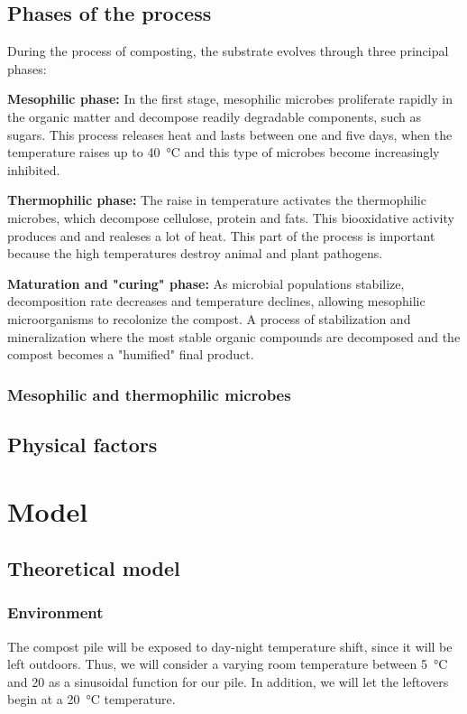 \documentclass[12pt, a4paper, twocolumn]{article}
\numberwithin{table}{section}
\numberwithin{figure}{section}
\numberwithin{equation}{section}
\begin{document}
\subsection{Phases of the process}
During the process of composting, the substrate evolves through three principal phases:

\textbf{Mesophilic phase:} In the first stage, mesophilic microbes proliferate rapidly in the organic matter and decompose readily degradable components, such as sugars. This process releases heat and lasts between one and five days, when the temperature raises up to \SI{40}{\celsius} and this type of microbes become increasingly inhibited.

\textbf{Thermophilic phase:} The raise in temperature activates the thermophilic microbes, which decompose cellulose, protein and fats. This biooxidative activity produces  and  and realeses a lot of heat. This part of the process is important because the high temperatures destroy animal and plant pathogens.

\textbf{Maturation and "curing" phase:} As microbial populations stabilize, decomposition rate decreases and temperature declines, allowing mesophilic microorganisms to recolonize the compost. A process of stabilization and mineralization where the most stable organic compounds are decomposed and the compost becomes a "humified" final product.
 
\subsubsection{Mesophilic and thermophilic microbes}
\subsection{Physical factors}


\section{Model}

\subsection{Theoretical model}

\subsubsection{Environment}

The compost pile will be exposed to day-night temperature shift, since it will be left outdoors. Thus, we will consider a varying room temperature between \SI{5}{\celsius} and \si{20}{\celsius} as a sinusoidal function for our pile. In addition, we will let the leftovers begin at a \SI{20}{\celsius} temperature.  
\end{document}
